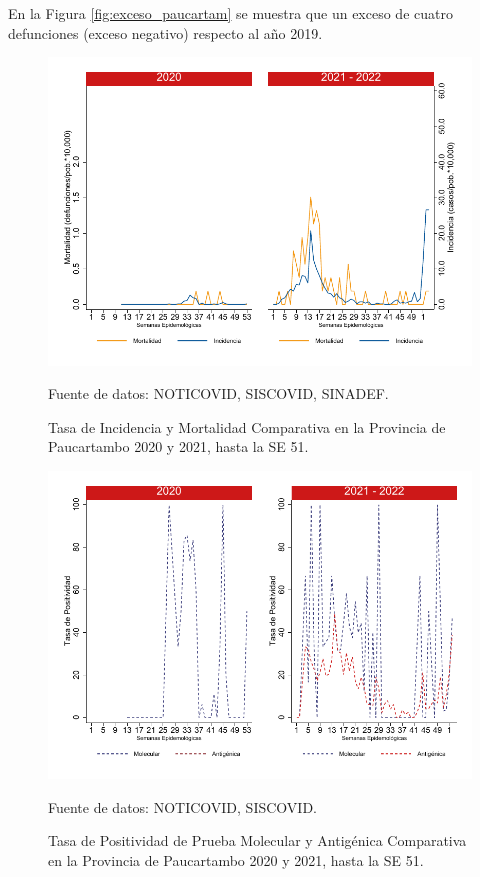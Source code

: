 \documentclass[12pt,a4paper,openany]{book}
\begin{document}
	En la Figura \ref{fig:exceso_paucartam} se muestra que un exceso de cuatro defunciones (exceso negativo) respecto al año 2019.
		
		\begin{figure}[h]
			\caption{Tasa de Incidencia y Mortalidad Comparativa en la Provincia de Paucartambo 2020 y 2021, hasta la SE 51.}\label{fig:inc_mort_paucartam}
			\begin{center}
				\includegraphics[width=0.7\linewidth]{../figuras/incidencia_mortalidad_20_21_11}
			\end{center}
			{\footnotesize {Fuente de datos: NOTICOVID, SISCOVID, SINADEF.}}
		\end{figure}
		
		\begin{figure}[h]
			\caption{Tasa de Positividad de Prueba Molecular y Antigénica Comparativa en la Provincia de Paucartambo 2020 y 2021, hasta la SE 51.}\label{fig:positividad_paucartam}
			\begin{center}
				\includegraphics[width=0.7\linewidth]{../figuras/positividad_20_21_11}
			\end{center}
			{\footnotesize {Fuente de datos: NOTICOVID, SISCOVID.}}
		\end{figure}
		
\end{document}
